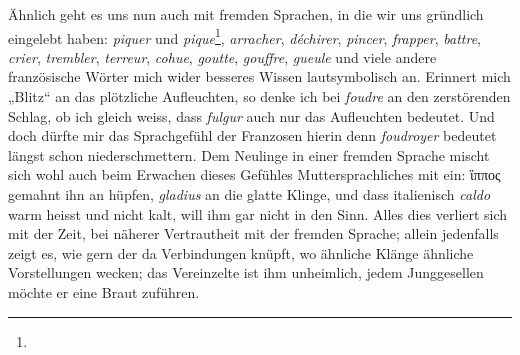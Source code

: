 {\label{fp.218}

Ähnlich geht es uns nun auch mit fremden Sprachen, in die wir uns gründlich eingelebt haben: \textit{piquer} und \textit{pique}\footnote{},  \textit{arracher}, \textit{déchirer}, \textit{pincer}, \textit{frapper}, \textit{battre}, \textit{crier}, \textit{trembler}, \textit{terreur}, \textit{cohue}, \textit{goutte}, \textit{gouffre}, \textit{gueule} und viele andere französische Wörter  mich wider besseres Wissen lautsymbolisch an. Erinnert mich „Blitz“ an das plötzliche Aufleuchten, so denke ich bei \textit{foudre} an den zerstörenden Schlag, ob ich gleich weiss, dass \textit{fulgur} auch nur das Aufleuchten bedeutet. Und doch dürfte mir das Sprachgefühl der Franzosen hierin  denn \textit{foudroyer} bedeutet längst schon niederschmettern. Dem Neulinge in einer fremden Sprache mischt sich wohl auch beim Erwachen dieses Gefühles Muttersprachliches mit ein: ἳππος gemahnt ihn an hüpfen, \textit{gladius} an die glatte Klinge, und dass italienisch \textit{caldo} warm heisst und nicht kalt, will ihm gar nicht in den \label{fp.27} Sinn. Alles dies verliert sich mit der Zeit, bei näherer Vertrautheit mit der fremden Sprache; allein jedenfalls zeigt es, wie gern der  da Verbindungen knüpft, wo ähnliche Klänge ähnliche Vorstellungen wecken; das Vereinzelte ist ihm unheimlich, jedem Junggesellen möchte er eine Braut zuführen.

}
